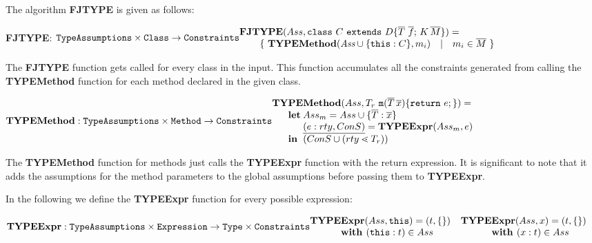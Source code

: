 \documentclass[runningheads]{llncs}
\begin{document}
The algorithm \textbf{FJTYPE} is given as follows:

\textbf{FJTYPE}:
$\texttt{TypeAssumptions} \times
\texttt{Class} \rightarrow \texttt{Constraints}\\
 \begin{array}{@{}l@{}l@{}l}
 \textbf{FJT}&\textbf{Y} & \textbf{PE}(Ass, \mathtt{class } \ C \ \mathtt{ extends } \ D \{ \overline{T} \ \overline{f}; \, K \, \overline{M} \}) =\\
& \multicolumn{2}{@{}l@{}}{ \{ \ \textbf{TYPEMethod}(\textit{Ass} \cup \{ \mathtt{this} : C \}, m_i) \quad | \quad m_i \in \overline{M} \ \} }\\ 
\end{array}$

The \textbf{FJTYPE} function gets called for every class in the input.
This function accumulates all the constraints generated from calling the
\textbf{TYPEMethod} function for each method declared in the given class.

$\textbf{TYPEMethod}:\texttt{TypeAssumptions} \times
\texttt{Method} \rightarrow \texttt{Constraints}\\
\begin{array}{@{}l@{}l@{}l}
\textbf{TY}& \textbf{PE} & \textbf{Method} (Ass, T_r \ \mathtt{m}(\overline{T} \, \overline{x})\{ \mathtt{ return }\ e; \}) =\\
& \textbf{let}
& Ass_m = Ass \cup \{ \overline{T} : \overline{x} \}\\
& & \ul{(e:rty, ConS)} = \textbf{TYPEExpr}(Ass_m, e)\\
& \mathbf{in}
& (ConS \cup (rty \lessdot T_r))\\
\end{array}
$

The \textbf{TYPEMethod} function for methods just calls the \textbf{TYPEExpr} function with the
return expression. It is significant to note that it adds the assumptions for the method parameters to the global assumptions before passing them to \textbf{TYPEExpr}.

\smallskip

In the following we define the \textbf{TYPEExpr} function for every possible expression:

\smallskip

$\textbf{TYPEExpr}:\texttt{TypeAssumptions} \times
\texttt{Expression} \rightarrow \texttt{Type} \times \texttt{Constraints}\\
\begin{array}{@{}l@{}l}
\textbf{TY} \textbf{PE} & \textbf{Expr} (Ass, \mathtt{this}) = (t , \{\})\\
& \textbf{with } (\mathtt{this} : t) \in Ass 
\end{array}
$
\smallskip
$\begin{array}{@{}l@{}l}
\textbf{TY} \textbf{PE} & \textbf{Expr} (Ass,x) = (t , \{\})\\
& \textbf{with } (x : t) \in Ass 
\end{array}
$
\end{document}
